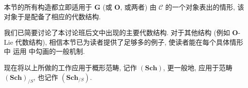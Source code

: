 本节的所有构造都立即适用于 \(\mathbf G\) (或 \(\mathbf O\),
或两者) 由 \(\mathscr C\) 的一个对象表出的情形,
该对象于是配备了相应的代数结构.

我们已简要讨论了本讨论班后文中出现的主要代数结构.
对于其他结构 (例如 \(\mathbf O\)-Lie 代数结构),
相信本节已为读者提供了足够多的例子, 使读者能在每个具体情形中
运用  中勾画的一般机制.

现在将以上所做的工作应用于概形范畴, 记作
\((\mathbf{Sch})\), 更一般地, 应用于范畴
\((\mathbf{Sch})_{/S}\), 也记作 \((\mathbf{Sch}_{/S})\).



